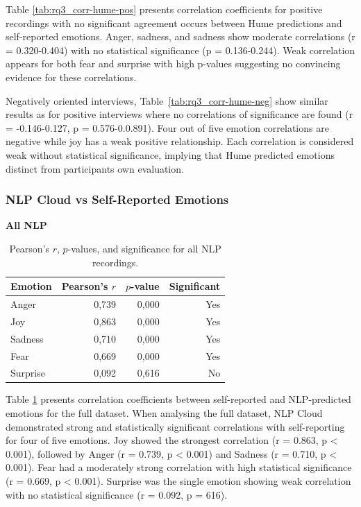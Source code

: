 Table \ref{tab:rq3_corr-hume-pos} presents correlation coefficients for positive recordings with no significant agreement occurs between Hume predictions and self-reported emotions. Anger, sadness, and sadness show moderate correlations (r = 0.320-0.404) with no statistical significance (p = 0.136-0.244). Weak correlation appears for both fear and surprise with high p-values suggesting no convincing evidence for these correlations. 

Negatively oriented interviews, Table~\ref{tab:rq3_corr-hume-neg} show similar results as for positive interviews where no correlations of significance are found (r = -0.146-0.127, p = 0.576-0.0.891). Four out of five emotion correlations are negative while joy has a weak positive relationship. Each correlation is considered weak without statistical significance, implying that Hume predicted emotions distinct from participants own evaluation.  
\subsubsection{NLP Cloud vs Self-Reported Emotions}
\label{sec:nlp-self}
\begin{table}[H]
    \centering
    \caption*{\textbf{All NLP}}
    \begin{tabular}{lrrr}
      \toprule
      \textbf{Emotion} & \textbf{Pearson’s \(r\)} & \textbf{\(p\)-value} & \textbf{Significant} \\
      \midrule
      Anger    & 0,739 & 0,000 & Yes \\
      Joy      & 0,863 & 0,000 & Yes \\
      Sadness  & 0,710 & 0,000 & Yes \\
      Fear     & 0,669 & 0,000 & Yes \\
      Surprise & 0,092 & 0,616 & No  \\
      \bottomrule
    \end{tabular}
    \caption{Pearson’s \(r\), \(p\)-values, and significance for all NLP recordings.}
    \label{tab:rq3_corr-nlp-all}
  \end{table}

  Table \ref{tab:rq3_corr-nlp-all} presents correlation coefficients between self-reported and NLP-predicted emotions for the full dataset.
  When analysing the full dataset, NLP Cloud demonstrated strong and statistically significant correlations with self-reporting for four of five emotions. Joy showed the strongest correlation (r = 0.863, p < 0.001), followed by Anger (r = 0.739, p < 0.001) and Sadness (r = 0.710, p < 0.001). 
Fear had a moderately strong correlation with high statistical significance (r = 0.669, p < 0.001). Surprise was the single emotion showing weak correlation with no statistical significance (r = 0.092, p = 616). 
  
